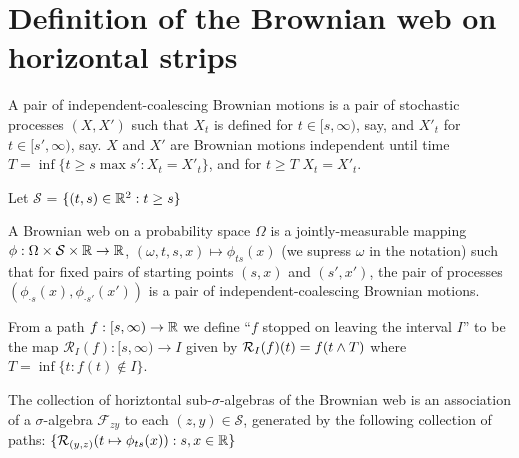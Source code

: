 {
\newcommand{\factor}[2]{\mathcal{F}_{#1 #2}}
\newcommand{\commafactor}[2]{\mathcal{F}_{#1,#2}}
\newcommand{\simplex}{\mathcal{S}}

\section{Definition of the Brownian web on horizontal strips}

\begin{definition}
  A pair of independent-coalescing Brownian motions is a pair of
  stochastic processes $(X, X')$ such that $X_t$ is defined for $t \in
  [s, \infty)$, say, and $X'_t$ for $t \in [s', \infty)$, say.  $X$
      and $X'$ are Brownian motions independent until time $T = \inf
      \{ t \ge s \max s' : X_t = X'_t\}$, and for $t \ge T$ $X_t =
      X'_t$.
\end{definition}

\begin{definition}
  Let $\simplex$ = $\{(t, s) \in \mathbb{R}^2 : t \ge s\}$
\end{definition}

\begin{definition}
  A Brownian web on a probability space $\Omega$ is a
  jointly-measurable mapping $\phi : \Omega \cross \simplex \cross
  \R \to \R$, $(\omega, t, s, x) \mapsto \phi_{ts}(x)$ (we supress
  $\omega$ in the notation) such that for fixed pairs of starting
  points $(s, x)$ and $(s', x')$, the pair of processes $(\phi_{\cdot
    s}(x), \phi_{\cdot s'}(x'))$ is a pair of independent-coalescing
  Brownian motions.
\end{definition}

\newcommand{\restrict}[2]{\mathcal{R}_{#1}(#2)}

\begin{definition}
  From a path $f : [s, \infty) \to \mathbb{R}$ we define ``$f$ stopped on
    leaving the interval $I$'' to be the map $\restrict{I}{f} : [s,
      \infty) \to I$ given by $\restrict{I}{f}(t) = f(t \minsym T)$
      where $T = \inf\{ t : f(t) \not\in I \}$.
\end{definition}

\begin{definition}
  The collection of horiztontal sub-$\sigma$-algebras of the Brownian web is an
  association of a $\sigma$-algebra $\factor{z}{y}$ to each $(z, y)
  \in \simplex$, generated by the following collection of paths:
  $\{ \restrict{(y,z)}{t \mapsto \phi_{ts}(x)} : s, x \in \R \}$
\end{definition}

}

